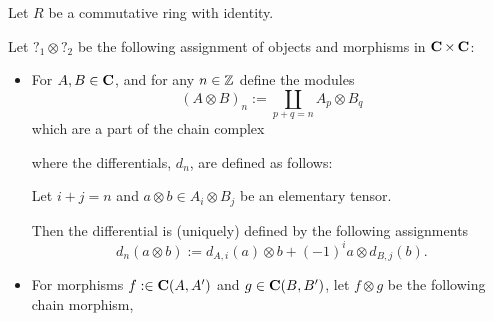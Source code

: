 \begin{definition}
    \label{def:tensor_product_of_chain_complexes_over_Mod(R)}
    Let \( R \) be a commutative ring with identity.
    
    Let \( ?_1 \otimes ?_2 \) be the following assignment of objects and morphisms in \( \operatorname{\mathbf{C}} \times \operatorname{\mathbf{C}} \):
    \begin{itemize}
        \item {
            For \( A, B \in \operatorname{\mathbf{C}} \), and for any  \( n \in {\mathbb{Z}} \) define the modules
            \[
                (A \otimes B)_n := \coprod_{p + q = n} A_p \otimes B_q
            \]
            which are a part of the chain complex
            \begin{center}
            \end{center}
            where the differentials, \( d_n \), are defined as follows:
            
            Let \( i + j = n \) and \( a \otimes b \in A_i \otimes B_j \) be an elementary tensor.

            Then the differential is (uniquely) defined by the following assignments
            \[
                d_n(a \otimes b) := d_{A, i}(a) \otimes b + (-1)^{i} a \otimes d_{B, j}(b).
            \]
        }
        \item {
            For morphisms \( f: \in \operatorname{\mathbf{C}}(A, A') \) and \( g \in \operatorname{\mathbf{C}}(B, B') \), let \( f \otimes g \) be the following chain morphism,
            \begin{center}
\end{center}}
\end{itemize}
\end{definition}
